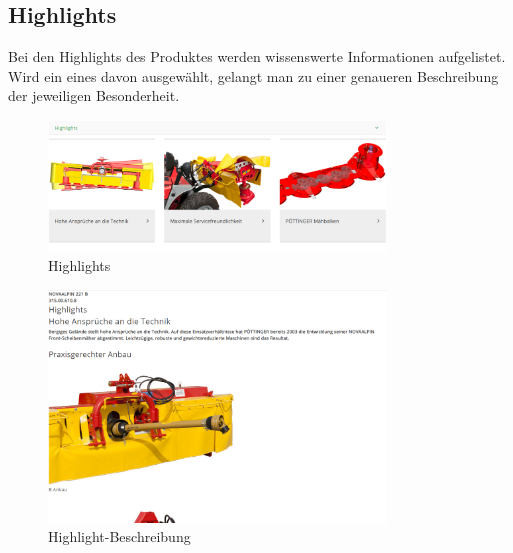 \subsection{Highlights}
Bei den Highlights des Produktes werden wissenswerte Informationen aufgelistet. Wird ein eines davon ausgewählt, gelangt man zu einer genaueren Beschreibung der jeweiligen Besonderheit.
\begin{figure}[H]
	\centerline{
		\includegraphics[width=0.8\textwidth]{./grafiken/erm_detailansicht_highlights.PNG}
	}
	\vskip0pt
	\caption{Highlights} \label{fig:highlight}
\end{figure}
\begin{figure}[H]
	\centerline{
		\includegraphics[width=0.8\textwidth]{./grafiken/erm_detailansicht_highlights_beschreibung.PNG}
	}
	\vskip0pt
	\caption{Highlight-Beschreibung} \label{fig:highlightbeschreibung}
\end{figure}
